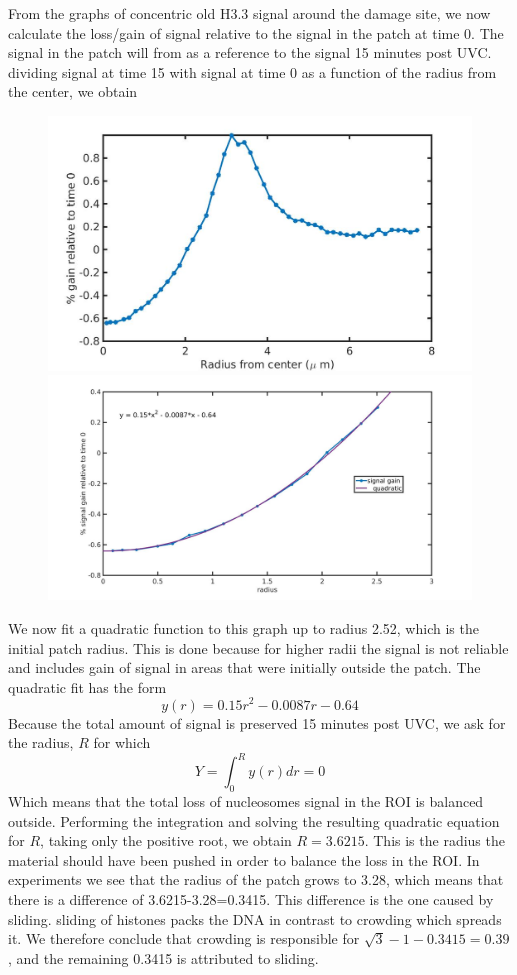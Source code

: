 \documentclass[12pt]{report}
\begin{document}
From the graphs of concentric old H3.3 signal around the damage site, we now calculate the loss/gain of signal relative to the signal in the patch at time 0. The signal in the patch will from as a reference to the signal 15 minutes post UVC. dividing signal at time 15 with signal at time 0 as a function of the radius from the center, we obtain 

\begin{figure}[H]
\includegraphics[width=0.5\linewidth, height=0.3\textheight]{Images/patchExpansion/relativeGainNucleosomesConcentric}
\includegraphics[width=0.5\linewidth, height=0.3\textheight]{Images/patchExpansion/nucleosomeSignalGainConcentricFit}
\caption{}
\label{fig:relativeGainNucleosomesConcentric}
\end{figure}

We now fit a quadratic function to this graph up to radius 2.52, which is the initial patch radius. This is done because for higher radii the signal is not reliable and includes gain of signal in areas that were initially outside the patch. The quadratic fit has the form 
\begin{equation*}
y(r)=0.15r^2-0.0087r-0.64
\end{equation*}
Because the total amount of signal is preserved 15 minutes post UVC, we ask for the radius, $R$ for which 
\begin{equation*}
Y=\int_0^R y(r)dr = 0
\end{equation*}
Which means that the total loss of nucleosomes signal in the ROI is balanced outside.
Performing the integration and solving the resulting quadratic equation for $R$, taking only the positive root, we obtain $R=3.6215$. This is the radius the material should have been pushed in order to balance the loss in the ROI. In experiments we see that the radius of the patch grows to 3.28, which means that there is a difference of 3.6215-3.28=0.3415. This difference is the one caused by sliding. sliding of histones packs the DNA in contrast to crowding which spreads it. We therefore conclude that crowding is responsible for $\sqrt{3}-1 -0.3415=0.39$, and the remaining 0.3415 is attributed to sliding. 
\end{document}
